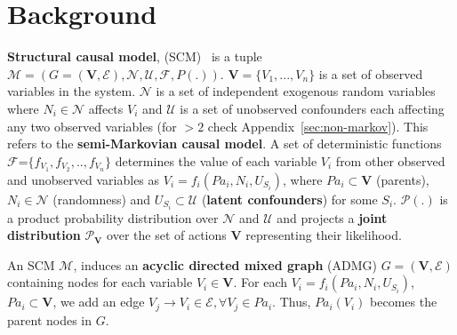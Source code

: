 \documentclass{article}
\newcommand{\blue}{\textcolor{blue}}
\newcommand{\V}{\mathbf{V}}
\theoremstyle{plain}
\theoremstyle{definition}
\newtheorem{definition}[theorem]{Definition}
\theoremstyle{remark}
\begin{document}
 \section{Background}
 \textbf{Structural causal model}, (SCM)~\citep{pearl1980causality}
		is a tuple 
		$\mathcal{M} = (G=(\V,\mathcal{E}), \mathcal{N}, \mathcal{U}, \mathcal{F}, P(.) )$. 
		$\V=\{V_1,..., V_n\}$ is a set of observed variables in the system.
		$\mathcal{N}$ is a set of independent exogenous random variables where $N_i\in 
		\mathcal{N}$ affects $V_i$ and $\mathcal{U}$ is a set of unobserved confounders each affecting any two observed variables (for $>2$ check Appendix~\ref{sec:non-markov}). This refers to the \textbf{semi-Markovian causal model}. A set of deterministic functions $\mathcal{F}$=$\{f_{V_1}, f_{V_2},..,f_{V_n}\}$ 
		determines the value of each variable $V_i$ from other observed and unobserved variables as $V_i=f_i(Pa_i, N_i, U_{S_i})$, where $Pa_i\subset \V$ (parents), $N_i \in \mathcal{N}$ (randomness) and $U_{S_i} \subset \mathcal{U}$ (\textbf{latent confounders}) for some $S_i$. 
		$\mathcal{P}(.)$ is a product probability distribution over $\mathcal{N}$ and  $\mathcal{U}$  and projects a \textbf{joint distribution} $\mathcal{P}_{\V}$ over the  
		set of actions $\V$ representing their likelihood.
		\par
		An SCM $\mathcal{M}$, induces an \textbf{acyclic directed mixed graph} (ADMG) $G=(\V,\mathcal{E})$ containing nodes for each variable $V_i\in \V$.
		For each $V_i=f_i(Pa_i, N_i, U_{S_i})$, $Pa_i\subset \V$, we add an edge $V_j \rightarrow V_i\in \mathcal{E}, \forall V_j\in Pa_i$. Thus, $Pa_i(V_i)$ becomes the parent nodes in $G$.
\end{document}
